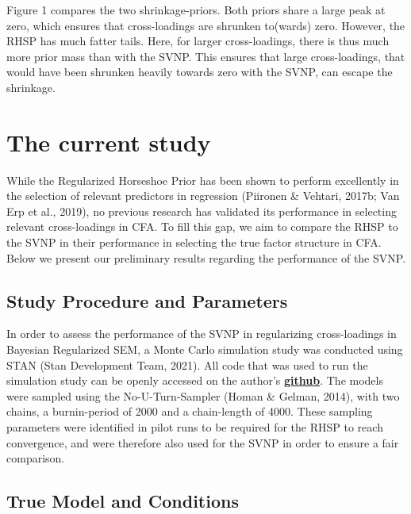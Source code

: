 \documentclass[
  man,floatsintext]{apa6}
\begin{document}
Figure 1 compares the two shrinkage-priors. Both priors share a large peak at zero, which ensures that cross-loadings are shrunken to(wards) zero. However, the RHSP has much fatter tails. Here, for larger cross-loadings, there is thus much more prior mass than with the SVNP. This ensures that large cross-loadings, that would have been shrunken heavily towards zero with the SVNP, can escape the shrinkage.

\hypertarget{the-current-study}{%
\section{The current study}\label{the-current-study}}

While the Regularized Horseshoe Prior has been shown to perform excellently in the selection of relevant predictors in regression (Piironen \& Vehtari, 2017b; Van Erp et al., 2019), no previous research has validated its performance in selecting relevant cross-loadings in CFA. To fill this gap, we aim to compare the RHSP to the SVNP in their performance in selecting the true factor structure in CFA. Below we present our preliminary results regarding the performance of the SVNP.

\hypertarget{study-procedure-and-parameters}{%
\subsection{Study Procedure and Parameters}\label{study-procedure-and-parameters}}

In order to assess the performance of the SVNP in regularizing cross-loadings in Bayesian Regularized SEM, a Monte Carlo simulation study was conducted using STAN (Stan Development Team, 2021). All code that was used to run the simulation study can be openly accessed on the author's \href{https://github.com/JMBKoch/1vs2StepBayesianRegSEM}{\textbf{github}}. The models were sampled using the No-U-Turn-Sampler (Homan \& Gelman, 2014), with two chains, a burnin-period of 2000 and a chain-length of 4000. These sampling parameters were identified in pilot runs to be required for the RHSP to reach convergence, and were therefore also used for the SVNP in order to ensure a fair comparison.

\hypertarget{true-model-and-conditions}{%
\subsection{True Model and Conditions}\label{true-model-and-conditions}}
\end{document}
